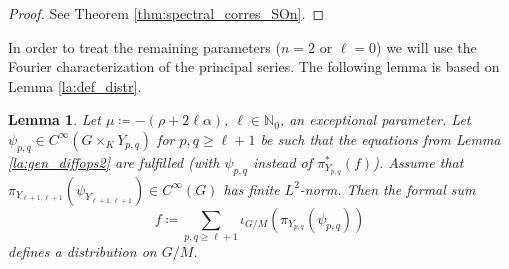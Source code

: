 \documentclass[JEP,XML,SOM,NoFloatCountersInSection,Unicode,published]{cedram}
\newtheorem{lemma}[theorem]{Lemma}
\theoremstyle{definition}
\newcommand{\rhoa}{\ensuremath{\rho}}
\newcommand{\N}{\ensuremath{\mathbb{N}}}
\begin{document}
\begin{proof}
See Theorem \ref{thm:spectral_corres_SOn}.
\end{proof}

In order to treat the remaining parameters ($n=2$ or $\ell=0$) we will use the Fourier characterization of the principal series. The following lemma is based on Lemma \ref{la:def_distr}.
\begin{lemma}\label{la:poly_growth_SUn}
Let $\mu\coloneqq-(\rhoa+2\ell\alpha)$, $\ell\in\N_0$, an exceptional parameter. Let $\psi_{p,q}\in C^\infty(G\times_KY_{p,q})$ for $p,q\geq\ell+1$ be such that the equations from Lemma \ref{la:gen_diffops2} are fulfilled (with $\psi_{p,q}$ instead of $\pi_{Y_{p,q}}^*(f)$). Assume that $\pi_{Y_{\ell+1,\ell+1}}(\psi_{Y_{\ell+1,\ell+1}})\in C^\infty(G)$ has finite $L^2$-norm.
Then the formal sum\vspace*{-3pt}
\[
f\coloneqq\sum_{p,q\geq\ell+1}\iota_{G/M}(\pi_{Y_{p,q}}(\psi_{p,q}))
\]
defines a distribution on $G/M$.
\end{lemma}
\end{document}

